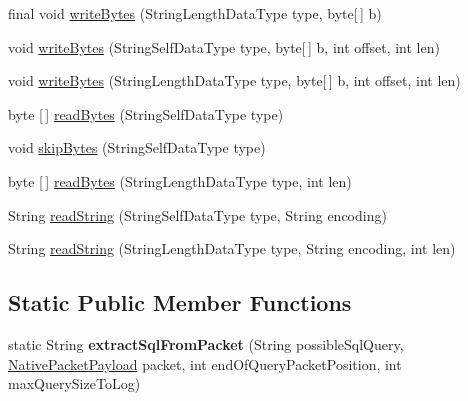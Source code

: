 \begin{DoxyCompactItemize}
final void \mbox{\hyperlink{classcom_1_1mysql_1_1cj_1_1protocol_1_1a_1_1_native_packet_payload_a980a8f52827e0084c623c0d0c6b27e5f}{write\+Bytes}} (String\+Length\+Data\+Type type, byte\mbox{[}$\,$\mbox{]} b)
\item 
void \mbox{\hyperlink{classcom_1_1mysql_1_1cj_1_1protocol_1_1a_1_1_native_packet_payload_ac5301ca0c4705a68a1be3815410bef3b}{write\+Bytes}} (String\+Self\+Data\+Type type, byte\mbox{[}$\,$\mbox{]} b, int offset, int len)
\item 
void \mbox{\hyperlink{classcom_1_1mysql_1_1cj_1_1protocol_1_1a_1_1_native_packet_payload_ad5aec078f1f7185c3a4bf9cb3512cf86}{write\+Bytes}} (String\+Length\+Data\+Type type, byte\mbox{[}$\,$\mbox{]} b, int offset, int len)
\item 
byte \mbox{[}$\,$\mbox{]} \mbox{\hyperlink{classcom_1_1mysql_1_1cj_1_1protocol_1_1a_1_1_native_packet_payload_a58481f149631e0df20f8070d086dc7a1}{read\+Bytes}} (String\+Self\+Data\+Type type)
\item 
void \mbox{\hyperlink{classcom_1_1mysql_1_1cj_1_1protocol_1_1a_1_1_native_packet_payload_afea96a6e9c4a2fc5e4faf2582a0899b1}{skip\+Bytes}} (String\+Self\+Data\+Type type)
\item 
byte \mbox{[}$\,$\mbox{]} \mbox{\hyperlink{classcom_1_1mysql_1_1cj_1_1protocol_1_1a_1_1_native_packet_payload_a11abcbc7ccdaa3c84eb67d2b7f194270}{read\+Bytes}} (String\+Length\+Data\+Type type, int len)
\item 
String \mbox{\hyperlink{classcom_1_1mysql_1_1cj_1_1protocol_1_1a_1_1_native_packet_payload_a63ebde96c09048957ca95498c76d3a36}{read\+String}} (String\+Self\+Data\+Type type, String encoding)
\item 
String \mbox{\hyperlink{classcom_1_1mysql_1_1cj_1_1protocol_1_1a_1_1_native_packet_payload_ac700d17fde03d8cc82d3e04eaa7ac596}{read\+String}} (String\+Length\+Data\+Type type, String encoding, int len)
\end{DoxyCompactItemize}
\subsection*{Static Public Member Functions}
\begin{DoxyCompactItemize}
\item 
\mbox{\label{classcom_1_1mysql_1_1cj_1_1protocol_1_1a_1_1_native_packet_payload_a8ca35d465ee7fe7c94dc8eb828d52b82}} 
static String {\bfseries extract\+Sql\+From\+Packet} (String possible\+Sql\+Query, \mbox{\hyperlink{classcom_1_1mysql_1_1cj_1_1protocol_1_1a_1_1_native_packet_payload}{Native\+Packet\+Payload}} packet, int end\+Of\+Query\+Packet\+Position, int max\+Query\+Size\+To\+Log)
\end{DoxyCompactItemize}
